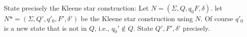   State precisely the Kleene star construction:
  Let $N = (\Sigma, Q, q_0 F, \delta)$.
  let $N* = (\Sigma, Q', q'_0, F', \delta')$ be the Kleene star construction using $N$.
  Of course $q'_0$ is a new state that is not in $Q$, i.e., $q_0' \not\in Q$.
  State $Q', F', \delta'$ precisely.
